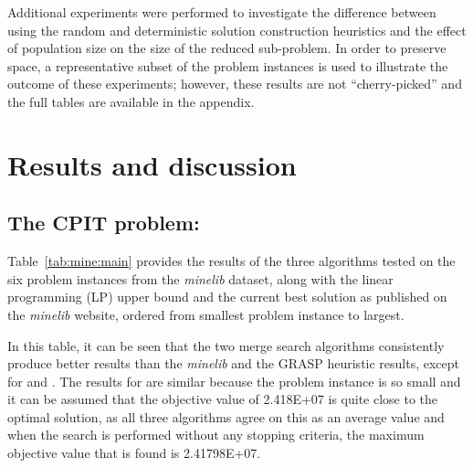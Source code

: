 \documentclass[journal]{IEEEtran}
\begin{document}
Additional experiments were performed to investigate the difference between using the random and deterministic solution construction heuristics and the effect of population size on the size of the reduced sub-problem. In order to preserve space, a representative subset of the problem instances is used to illustrate the outcome of these experiments; however, these results are not ``cherry-picked'' and the full tables are available in the appendix. 

\section{Results and discussion}
\subsection{The CPIT problem:}
Table~\ref{tab:mine:main} provides the results of the three algorithms tested on the six problem instances from the \emph{minelib} dataset, along with the linear programming (LP) upper bound and the current best solution as published on the \emph{minelib} website, ordered from smallest problem instance to largest.

In this table, it can be seen that the two merge search algorithms consistently produce better results than the \emph{minelib} and the GRASP heuristic results, except for \newman{} and \zucklarge{}. The results for \newman{} are similar because the problem instance is so small and it can be assumed that the objective value of 2.418E+07 is quite close to the optimal solution, as all three algorithms agree on this as an average value and when the search is performed without any stopping criteria, the maximum objective value that is found is 2.41798E+07.
\end{document}
